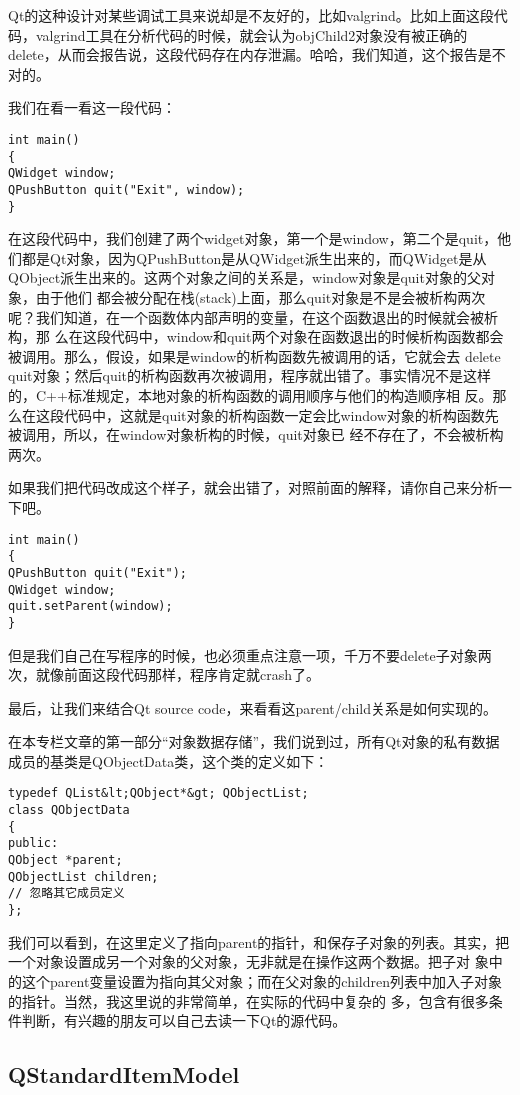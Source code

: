 Qt的这种设计对某些调试工具来说却是不友好的，比如valgrind。比如上面这段代码，valgrind工具在分析代码的时候，就会认为objChild2对象没有被正确的delete，从而会报告说，这段代码存在内存泄漏。哈哈，我们知道，这个报告是不对的。

我们在看一看这一段代码：
\begin{lstlisting}
int main()
{
QWidget window;
QPushButton quit("Exit", window);
}    
\end{lstlisting}

在这段代码中，我们创建了两个widget对象，第一个是window，第二个是quit，他们都是Qt对象，因为QPushButton是从QWidget派生出来的，而QWidget是从QObject派生出来的。这两个对象之间的关系是，window对象是quit对象的父对象，由于他们 都会被分配在栈(stack)上面，那么quit对象是不是会被析构两次呢？我们知道，在一个函数体内部声明的变量，在这个函数退出的时候就会被析构，那 么在这段代码中，window和quit两个对象在函数退出的时候析构函数都会被调用。那么，假设，如果是window的析构函数先被调用的话，它就会去 delete quit对象；然后quit的析构函数再次被调用，程序就出错了。事实情况不是这样的，C++标准规定，本地对象的析构函数的调用顺序与他们的构造顺序相 反。那么在这段代码中，这就是quit对象的析构函数一定会比window对象的析构函数先被调用，所以，在window对象析构的时候，quit对象已 经不存在了，不会被析构两次。

如果我们把代码改成这个样子，就会出错了，对照前面的解释，请你自己来分析一下吧。
\begin{lstlisting}
int main()
{
QPushButton quit("Exit");
QWidget window;
quit.setParent(window);
}    
\end{lstlisting}

但是我们自己在写程序的时候，也必须重点注意一项，千万不要delete子对象两次，就像前面这段代码那样，程序肯定就crash了。

最后，让我们来结合Qt source code，来看看这parent/child关系是如何实现的。

在本专栏文章的第一部分“对象数据存储”，我们说到过，所有Qt对象的私有数据成员的基类是QObjectData类，这个类的定义如下：
\begin{lstlisting}
typedef QList&lt;QObject*&gt; QObjectList;
class QObjectData
{
public:
QObject *parent;
QObjectList children;
// 忽略其它成员定义
};    
\end{lstlisting}

我们可以看到，在这里定义了指向parent的指针，和保存子对象的列表。其实，把一个对象设置成另一个对象的父对象，无非就是在操作这两个数据。把子对 象中的这个parent变量设置为指向其父对象；而在父对象的children列表中加入子对象的指针。当然，我这里说的非常简单，在实际的代码中复杂的 多，包含有很多条件判断，有兴趣的朋友可以自己去读一下Qt的源代码。
\subsection{QStandardItemModel}